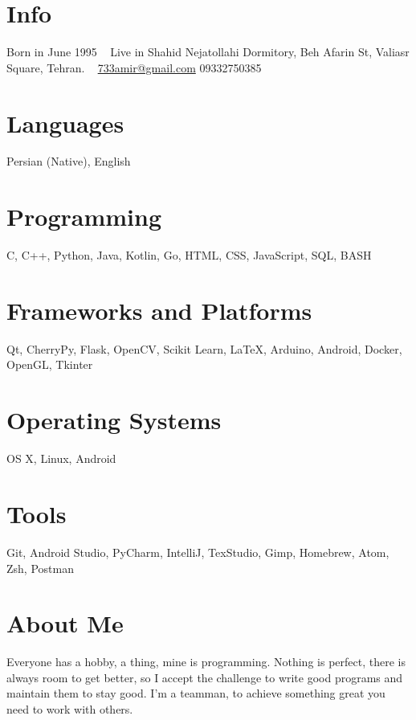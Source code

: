\documentclass[]{friggeri-cv}
\begin{document}


\begin{aside}	
  \section{Info}
    Born in June 1995
    ~
    Live in Shahid Nejatollahi Dormitory, Beh Afarin St, Valiasr Square, Tehran.
    ~
    \href{mailto:733amir@gmail.com}{733amir@gmail.com}
    09332750385
  \section{Languages}
    Persian (Native),
    English
  \section{Programming}
	C, C++, Python, Java, Kotlin, Go, HTML, CSS, JavaScript, SQL, BASH
  \section{Frameworks and Platforms}
    Qt, CherryPy, Flask, OpenCV, Scikit Learn, LaTeX, Arduino, Android, Docker, OpenGL, Tkinter
  \section{Operating Systems}
  OS X, Linux, Android
  \section{Tools}
  Git, Android Studio, PyCharm, IntelliJ, TexStudio, Gimp, Homebrew, Atom, Zsh, Postman
\end{aside}

\section{About Me}


Everyone has a hobby, a thing, mine is programming. Nothing is perfect, there is always room to get better, so I accept the challenge to write good programs and maintain them to stay good. I'm a teamman, to achieve something great you need to work with others.
\end{document}
